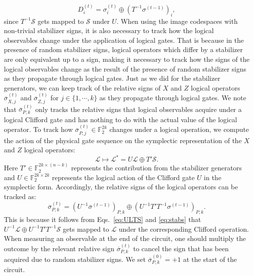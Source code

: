 \begin{equation}
    D_i^{(t)} = \sigma^{(t)}_i \oplus (T^{-1}\sigma^{(t-1)})_i,
\end{equation}
since $T^{-1}\mathcal{S}$ gets mapped to $\mathcal{S}$ under $U$.
When using the image codespaces with non-trivial stabilizer signs, it is also necessary to track how the logical observables change under the application of logical gates. That is because in the presence of random stabilizer signs, logical operators which differ by a stabilizer are only equivalent up to a sign, making it necessary to track how the signs of the logical observables change as the result of the presence of random stabilizer signs as they propagate through logical gates. Just as we did for the stabilizer generators, we can keep track of the relative signs of $X$ and $Z$ logical operators $\overline{\sigma}_{X,j}^{(t)}$ and $\overline{\sigma}_{Z,j}^{(t)}$ for $j \in \{1,\cdots,k\}$ as they propagate through logical gates. We note that $\overline{\sigma}_{P,k}^{(t)}$ only tracks the relative signs that logical observables acquire under a logical Clifford gate and has nothing to do with the actual value of the logical operator. To track how $\overline{\sigma}_{P,j}^{(t)}\in \mathbb{F}_2^{2k}$ changes under a logical operation, we compute the action of the physical gate sequence on the symplectic representation of the $X$ and $Z$ logical operators: 
\begin{equation}\label{eq:ULTS}
    \mathcal{L}\mapsto \mathcal{L}^* = U \mathcal{L} \oplus T' \mathcal{S}.
\end{equation}
Here $T' \in \mathbb{F}_2^{2k \times (n-k)}$ represents the contribution from the stabilizer generators and $U\in \mathbb{F}_2^{2k \times 2k}$ represents the logical action of the Clifford gate $U$ in the symplectic form. Accordingly, the relative signs of the logical operators can be tracked as:
\begin{equation}
    \overline{\sigma}_{P,k}^{(t)} = (U^{-1}\overline{\sigma}^{(t-1)})_{P,k} \oplus (U^{-1} T' T^{-1}\sigma^{(t-1)})_{P,k}.
\end{equation}
This is because it follows from Eqs.~\eqref{eq:ULTS} and \eqref{eq:stabs} that $U^{-1}\mathcal{L}\oplus U^{-1} T' T^{-1}\mathcal{S}$ gets mapped to $\mathcal{L}$ under the corresponding Clifford operation. When measuring an observable at the end of the circuit, one should multiply the outcome by the relevant relative sign $\overline{\sigma}^{(t)}_{P,k}$ to cancel the sign that has been acquired due to random stabilizer signs. We set $\overline{\sigma}^{(0)}_{P,k}=+1$ at the start of the circuit.
